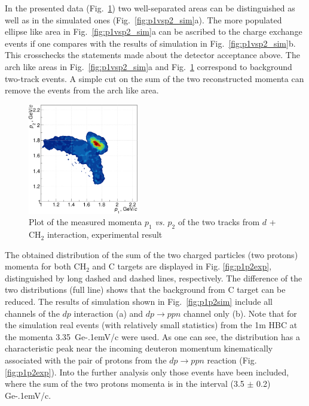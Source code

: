 \documentclass[twocolumn,epjc3]{svjour3}
\newcommand{\dpfrag} {\ensuremath{dp \rightarrow ppn}\xspace}
\newcommand{\GeVc}   {Ge\kern-.1emV/c\xspace}
\begin{document}
In the presented data (Fig.~\ref{fig:p1vsp2_exp}) two well-separated areas can
be distinguished as well as in the simulated ones
(Fig.~\ref{fig:p1vsp2_sim}a). The more populated ellipse like area in
Fig.~\ref{fig:p1vsp2_sim}a can be ascribed to the charge exchange events if one
compares with the results of simulation in Fig.~\ref{fig:p1vsp2_sim}b. This
crosschecks the statements made about the detector acceptance above. The arch
like areas in Fig.~\ref{fig:p1vsp2_sim}a and Fig.~\ref{fig:p1vsp2_exp}
correspond to background two-track events. A simple cut on the sum of the two
reconstructed momenta can remove the events from the arch like area.

\begin{figure}[h]
  \centering
  \includegraphics[width=0.43\textwidth]{p1_vs_p2_2.pdf}
  \caption{Plot of the measured momenta $p_1$ \textit{vs.} $p_2$ of the two
    tracks from $d$ + CH$_{2}$ interaction, experimental result}
  \label{fig:p1vsp2_exp}
\end{figure}

The obtained distribution of the sum of the two charged particles (two protons)
momenta for both CH$_2$ and C targets are displayed in Fig. \ref{fig:p1p2exp},
distinguished by long dashed and dashed lines, respectively. The difference of
the two distributions (full line) shows that the background from C target can be
reduced. The results of simulation shown in Fig.~\ref{fig:p1p2sim} include all
channels of the $dp$ interaction (a) and \dpfrag channel only (b). Note that for
the simulation real events (with relatively small statistics) from the 1m HBC at
the momenta 3.35~\GeVc were used. As one can see, the distribution has a
characteristic peak near the incoming deuteron momentum kinematically associated
with the pair of protons from the \dpfrag reaction (Fig. \ref{fig:p1p2exp}).
Into the further analysis only those events have been included, where the sum of
the two protons momenta is in the interval (3.5 $\pm$ 0.2) \GeVc.
\end{document}
